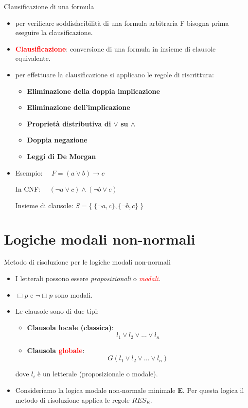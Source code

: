 \documentclass{beamer}
\begin{document}
\begin{frame}{Clausificazione di una formula}
    \begin{itemize}
        \item per verificare soddisfacibilità di una formula arbitraria F bisogna prima eseguire la clausificazione.
        \item \textcolor{red}{\textbf{Clausificazione}}: conversione di una formula in insieme di clausole equivalente.
        \item per effettuare la clausificazione si applicano le regole di riscrittura:
        \begin{itemize}
            \item \textbf{Eliminazione della doppia implicazione}
            \item \textbf{Eliminazione dell'implicazione}
            \item \textbf{Proprietà distributiva di $\lor$ su $\land$}
            \item \textbf{Doppia negazione}
            \item \textbf{Leggi di De Morgan}
        \end{itemize}
        \item Esempio: $\quad F = (a \lor b) \to c$
        
        In CNF: $\quad (\lnot a \lor c) \land (\lnot b \lor c)$
        
        Insieme di clausole: $S = \{ \; \{\lnot a, c\}, \{\lnot b, c\} \; \}$
    \end{itemize}
    
\end{frame}

\section{Logiche modali non-normali}
\begin{frame}{Metodo di risoluzione per le logiche modali non-normali}
    \begin{itemize}
        \item I letterali possono essere \emph{proposizionali} o \textcolor{red}{\emph{modali}}. 
        \item $\Box p$ e $\lnot \Box p$ sono modali.
        \item Le clausole sono di due tipi:
        \begin{itemize}
            \item \textbf{Clausola locale (classica)}: \[ l_1 \lor l_2 \lor \ldots \lor l_n \]
            \item \textbf{Clausola \textcolor{red}{globale}}: \[ G(l_1 \lor l_2 \lor \ldots \lor l_n) \]
        \end{itemize}
        dove $l_i$ è un letterale (proposizionale o modale).
        \item Consideriamo la logica modale non-normale minimale \textbf{E}. Per questa logica il metodo di risoluzione applica le regole $RES_E$. 
    \end{itemize}

\end{frame}
\end{document}

